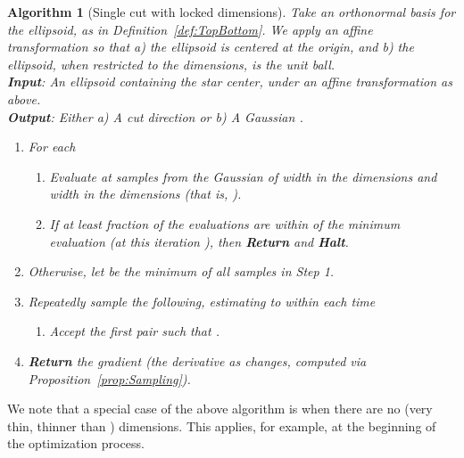 \documentclass[11pt,letter]{article}
\numberwithin{nTheorems}{section}
\newtheorem{myalgorithm}{Algorithm}
\begin{document}
\vspace{3mm}
\hspace*{-\parindent}\begin{minipage}{\linewidth}
\begin{framed}
\begin{myalgorithm}[Single cut with locked dimensions]
\label{alg:SingleCut}
Take an orthonormal basis for the ellipsoid, as in Definition~\ref{def:TopBottom}.
We apply an affine transformation so that a) the ellipsoid is centered at the origin, and b) the ellipsoid, when restricted to the  dimensions, is the unit ball.\\

\noindent\textbf{Input}: An ellipsoid containing the star center, under an affine transformation as above.\\
\textbf{Output}: \emph{Either} a) A cut direction  \emph{or} b) A Gaussian .

 \begin{enumerate}
 \item For each 
     \begin{enumerate}
     \item[1a.] Evaluate  at  samples from the Gaussian  of width  in the  dimensions and width  in the  dimensions (that is, ).
     \item[1b.] If at least  fraction of the evaluations are within  of the minimum evaluation (at this iteration ), then {\bf Return}  and {\bf Halt}.
     \end{enumerate}
 \item Otherwise, let  be the minimum of all samples in Step 1.
\item Repeatedly sample the following, estimating  to within  each time\vspace{-1mm} 
\begin{enumerate}\item[3a.]
    Accept the first pair  such that .
    \end{enumerate}
 \item {\bf Return} the gradient  \quad(the derivative as  changes, computed via Proposition~\ref{prop:Sampling}).
\end{enumerate}




\end{myalgorithm}
\end{framed}
\end{minipage}\vspace{3mm}

We note that a special case of the above algorithm is when there are no  (very thin, thinner than ) dimensions.
This applies, for example, at the beginning of the optimization process.
\end{document}

